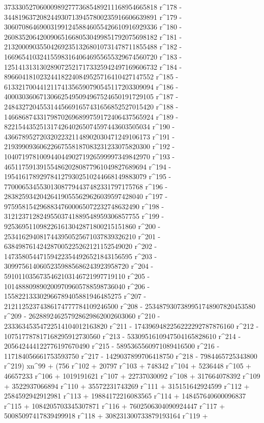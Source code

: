       3733305270600098927773685489211168954665818 r^178 - 
       3448196372082449307139457800235916606639891 r^179 - 
       3060708646900319912458846055426610916929336 r^180 - 
       2608352064200906516680530499851792075698182 r^181 - 
       2132000903550426923513268010731478711855488 r^182 - 
       1669654103241559831640646955655329674560720 r^183 - 
       1251413131302890725217173325942497169606732 r^184 - 
       896604181023244182240849525716410427147552 r^185 - 
       613321700441211741356590790545117203309094 r^186 - 
       400030360671306625495094967524650191729105 r^187 - 
       248432720455314456691657431656852527015420 r^188 - 
       146686874331798702696899759172406437565924 r^189 - 
       82215443525131742640265074597443603505034 r^190 - 
       43667895272032022321148902030471249106173 r^191 - 
       21939909360622667558187083231233075820300 r^192 - 
       10407197810094404490271926599997349842970 r^193 - 
       4651175913915548620280877961049827689694 r^194 - 
       1954161789297841279302510244668149883079 r^195 - 
       770006534553013087794437482331797175768 r^196 - 
       283825934204264190555629626039597428040 r^197 - 
       97595815429688347600065072232748632490 r^198 - 
       31212371282495503741889548959306857755 r^199 - 
       9253695110982261613042871800215151860 r^200 - 
       2534162940817443950525671037839326210 r^201 - 
       638498761424287005225262121152549020 r^202 - 
       147358054471594223544926521843156595 r^203 - 
       30997561406052359885686243923958720 r^204 - 
       5910110356735462103146721997719110 r^205 - 
       1014888098902009709605788598736040 r^206 - 
       155822133302966789405881946485275 r^207 - 
       21211252374386174777784109246500 r^208 - 
       2534879307389951748907820453580 r^209 - 
       262889246257928629862002603060 r^210 - 
       23336345354722514104012163820 r^211 - 
       1743969482256222292787876160 r^212 - 
       107517787817168295912730560 r^213 - 
       5330951610947504165828610 r^214 - 
       205642444122776197670490 r^215 - 
       5895365560971089416500 r^216 - 117184056661753593750 r^217 - 
       1429037899706418750 r^218 - 
       7984465725343800 r^219) xn^99 + (756 r^102 + 20797 r^103 + 
       748342 r^104 + 5236448 r^105 + 46657233 r^106 + 
       1019191621 r^107 + 22737030092 r^108 + 317664078392 r^109 + 
       3522937066894 r^110 + 35572231743269 r^111 + 
       315151642924599 r^112 + 2584592942912981 r^113 + 
       19884172216083565 r^114 + 148457640600096837 r^115 + 
       1084205703345307871 r^116 + 7602506304090924447 r^117 + 
       50085097417839499918 r^118 + 308231300733879193164 r^119 + 
